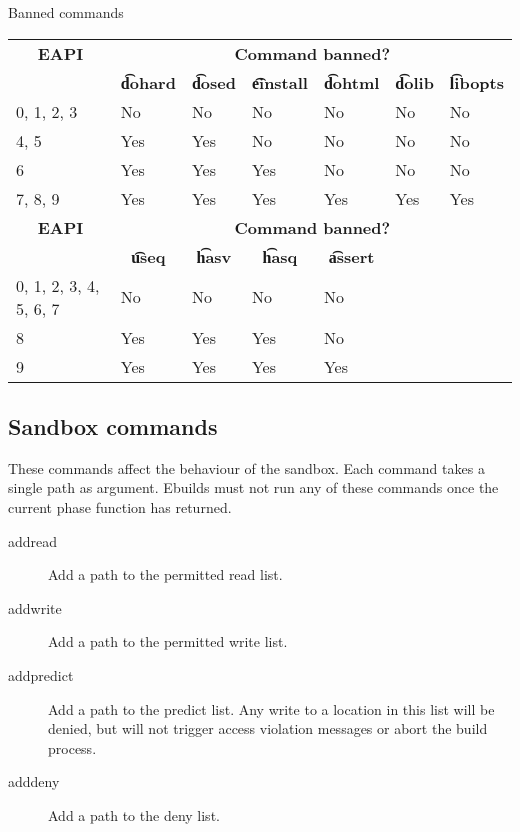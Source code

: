 \begin{centertable}{Banned commands}
    \label{tab:banned-commands-table}
    \begin{tabular}{lllllll}
      \toprule
      \multicolumn{1}{c}{\textbf{EAPI}} &
      \multicolumn{6}{c}{\textbf{Command banned?}} \\
      \multicolumn{1}{c}{} &
      \multicolumn{1}{c}{\textbf{\t{dohard}}} &
      \multicolumn{1}{c}{\textbf{\t{dosed}}} &
      \multicolumn{1}{c}{\textbf{\t{einstall}}} &
      \multicolumn{1}{c}{\textbf{\t{dohtml}}} &
      \multicolumn{1}{c}{\textbf{\t{dolib}}} &
      \multicolumn{1}{c}{\textbf{\t{libopts}}} \\
      \midrule
      0, 1, 2, 3        & No  & No  & No  & No  & No  & No  \\
      4, 5              & Yes & Yes & No  & No  & No  & No  \\
      6                 & Yes & Yes & Yes & No  & No  & No  \\
      7, 8, 9           & Yes & Yes & Yes & Yes & Yes & Yes \\
      \midrule
      \multicolumn{1}{c}{\textbf{EAPI}} &
      \multicolumn{6}{c}{\textbf{Command banned?}} \\
      \multicolumn{1}{c}{} &
      \multicolumn{1}{c}{\textbf{\t{useq}}} &
      \multicolumn{1}{c}{\textbf{\t{hasv}}} &
      \multicolumn{1}{c}{\textbf{\t{hasq}}} &
      \multicolumn{1}{c}{\textbf{\t{assert}}} & & \\
      \midrule
      0, 1, 2, 3, 4, 5, 6, 7  & No  & No  & No  & No  & & \\
      8                       & Yes & Yes & Yes & No  & & \\
      9                       & Yes & Yes & Yes & Yes & & \\
      \bottomrule
    \end{tabular}
\end{centertable}

\subsection{Sandbox commands}
These commands affect the behaviour of the sandbox. Each command takes a single path as argument.
Ebuilds must not run any of these commands once the current phase function has returned.
\begin{description}
\item[addread] Add a path to the permitted read list.
\item[addwrite] Add a path to the permitted write list.
\item[addpredict] Add a path to the predict list. Any write to a location in this list will be
    denied, but will not trigger access violation messages or abort the build process.
\item[adddeny] Add a path to the deny list.
\end{description}

